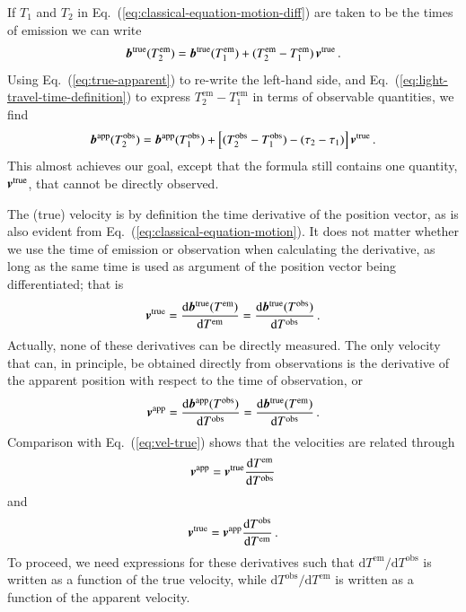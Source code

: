 \documentclass{aa}
\def\vec#1{\ensuremath{\mathchoice{\mbox{\boldmath$\displaystyle#1$}}
{\mbox{\boldmath$\textstyle#1$}}
{\mbox{\boldmath$\scriptstyle#1$}}
{\mbox{\boldmath$\scriptscriptstyle#1$}}}}
\begin{document}
If $T_1$ and $T_2$ in Eq.~(\ref{eq:classical-equation-motion-diff}) are taken to be
the times of emission we can write
\begin{equation}\label{eq:classical-equation-motion-diff1}
 \vec{b}^\mathrm{true}(T_2^\mathrm{em})=\vec{b}^\mathrm{true}(T_1^\mathrm{em})
 +(T_2^\mathrm{em}-T_1^\mathrm{em})\,\vec{v}^\mathrm{true} \, .
\end{equation}
Using Eq.~(\ref{eq:true-apparent}) to re-write the left-hand side, and
Eq.~(\ref{eq:light-travel-time-definition}) to express
$T_2^\mathrm{em}-T_1^\mathrm{em}$ in terms of observable quantities, we find
\begin{equation}\label{eq:pos-t-em-t-obs}
    \vec{b}^\mathrm{app}(T_2^\mathrm{obs})
    =
    \vec{b}^\mathrm{app}(T_1^\mathrm{obs})
    +
    \left[
    (T_2^\mathrm{obs}-T_1^\mathrm{obs}) - (\tau_2-\tau_1)
    \right] \vec{v}^\mathrm{true} \, .
\end{equation}
This almost achieves our goal, except that the formula still contains one quantity,
$\vec{v}^\mathrm{true}$, that cannot be directly observed.

The (true) velocity is by definition the time derivative of the position vector, as is also
evident from Eq.~(\ref{eq:classical-equation-motion}). It does not matter whether we
use the time of emission or observation when calculating the derivative, as long as the
same time is used as argument of the position vector being differentiated; that is
\begin{equation}\label{eq:vel-true}
    \vec{v}^\mathrm{true}
    =
    \frac{\mathrm{d}\vec{b}^\mathrm{true}(T^\mathrm{em})}
         {\mathrm{d}T^\mathrm{em}}
    =
    \frac{\mathrm{d}\vec{b}^\mathrm{true}(T^\mathrm{obs})}
         {\mathrm{d}T^\mathrm{obs}} \, .
\end{equation}
Actually, none of these derivatives can be directly measured. The only velocity that can,
in principle, be obtained directly from observations is the derivative of the apparent position
with respect to the time of observation, or
\begin{equation}\label{eq:vel-app}
    \vec{v}^\mathrm{app}
    =
    \frac{\mathrm{d}\vec{b}^\mathrm{app}(T^\mathrm{obs})}
         {\mathrm{d}T^\mathrm{obs}}
    =
    \frac{\mathrm{d}\vec{b}^\mathrm{true}(T^\mathrm{em})}
         {\mathrm{d}T^\mathrm{obs}}
    \,.
\end{equation}
Comparison with Eq.~(\ref{eq:vel-true}) shows that the velocities are related through
\begin{equation}\label{eq:vel-app-true-start}
    \vec{v}^\mathrm{app}
    =
    \vec{v}^\mathrm{true}
    \frac{\mathrm{d}T^\mathrm{em}}
         {\mathrm{d}T^\mathrm{obs}}
\end{equation}
and
\begin{equation}\label{eq:vel-true-app-start}
    \vec{v}^\mathrm{true}
    =
    \vec{v}^\mathrm{app}
    \frac{\mathrm{d}T^\mathrm{obs}}
         {\mathrm{d}T^\mathrm{em}} \, .
\end{equation}
To proceed, we need expressions for these derivatives such that
$\mathrm{d}T^\mathrm{em}/\mathrm{d}T^\mathrm{obs}$ is written as a function of
the true velocity, while $\mathrm{d}T^\mathrm{obs}/\mathrm{d}T^\mathrm{em}$ is
written as a function of the apparent velocity.
\end{document}
